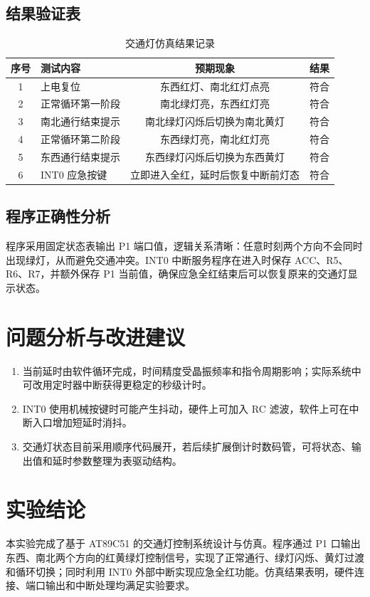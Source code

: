 \subsection{结果验证表}
\begin{table}[H]
  \centering
  \caption{交通灯仿真结果记录}
  \renewcommand{\arraystretch}{1.35}
  \begin{tabular}{clcc}
    \toprule
    序号 & 测试内容 & 预期现象 & 结果 \\
    \midrule
    1 & 上电复位 & 东西红灯、南北红灯点亮 & 符合 \\
    2 & 正常循环第一阶段 & 南北绿灯亮，东西红灯亮 & 符合 \\
    3 & 南北通行结束提示 & 南北绿灯闪烁后切换为南北黄灯 & 符合 \\
    4 & 正常循环第二阶段 & 东西绿灯亮，南北红灯亮 & 符合 \\
    5 & 东西通行结束提示 & 东西绿灯闪烁后切换为东西黄灯 & 符合 \\
    6 & INT0 应急按键 & 立即进入全红，延时后恢复中断前灯态 & 符合 \\
    \bottomrule
  \end{tabular}
\end{table}

\subsection{程序正确性分析}
程序采用固定状态表输出 P1 端口值，逻辑关系清晰：任意时刻两个方向不会同时出现绿灯，从而避免交通冲突。INT0 中断服务程序在进入时保存 ACC、R5、R6、R7，并额外保存 P1 当前值，确保应急全红结束后可以恢复原来的交通灯显示状态。

\section{问题分析与改进建议}
\begin{enumerate}
  \item 当前延时由软件循环完成，时间精度受晶振频率和指令周期影响；实际系统中可改用定时器中断获得更稳定的秒级计时。
  \item INT0 使用机械按键时可能产生抖动，硬件上可加入 RC 滤波，软件上可在中断入口增加短延时消抖。
  \item 交通灯状态目前采用顺序代码展开，若后续扩展倒计时数码管，可将状态、输出值和延时参数整理为表驱动结构。
\end{enumerate}

\section{实验结论}
本实验完成了基于 AT89C51 的交通灯控制系统设计与仿真。程序通过 P1 口输出东西、南北两个方向的红黄绿灯控制信号，实现了正常通行、绿灯闪烁、黄灯过渡和循环切换；同时利用 INT0 外部中断实现应急全红功能。仿真结果表明，硬件连接、端口输出和中断处理均满足实验要求。
